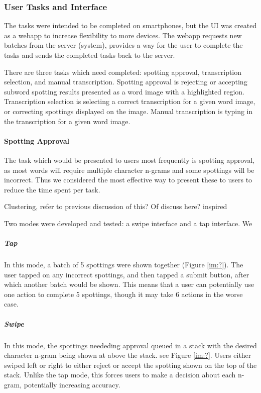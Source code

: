 \documentclass[ms,electronic,twosidetoc,letterpaper,chaptercenter,parttop,lol,lof,lot]{byumsphd}
\begin{document}
\subsubsection{User Tasks and Interface}

The tasks were intended to be completed on smartphones, but the UI was created as a webapp to increase flexibility to more devices. The webapp requests new batches from the server (system), provides a way for the user to complete the tasks and sends the completed tasks back to the server.

There are three tasks which need completed: spotting approval, transcription selection, and manual transcription. Spotting approval is rejecting or accepting subword spotting results presented as a word image with a highlighted region. Transcription selection is selecting a correct transcription for a given word image, or correcting spottings displayed on the image. Manual transcription is typing in the transcription for a given word image.

\paragraph{Spotting Approval}

The task which would be presented to users most frequently is spotting approval, as most words will require multiple character n-grams and some spottings will be incorrect. Thus we considered the most effective way to present these to users to reduce the time spent per task.

Clustering, refer to previous discussion of this? Of discuss here? \cite{Retsinas2015} inspired

\iffalse
Two modes were developed and tested: a swipe interface and a tap interface. We

\subparagraph{Tap}
In this mode, a batch of 5 spottings were shown together (Figure \ref{im:?}). The user tapped on any incorrect spottings, and then tapped a submit button, after which another batch would be shown. This means that a user can potentially use one action to complete 5 spottings, though it may take 6 actions in the worse case.

\subparagraph{Swipe}
In this mode, the spottings neededing approval queued in a stack with the desired character n-gram being shown at above the stack. see Figure \ref{im:?}. Users either swiped left or right to either reject or accept the spotting shown on the top of the stack. Unlike the tap mode, this forces users to make a decision about each n-gram, potentially increasing accuracy.
\end{document}
